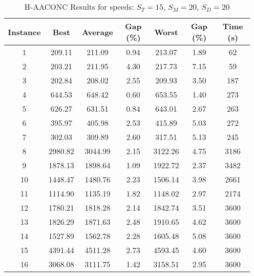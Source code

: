 \begin{table}[h]
	\centering
	\caption{H-AACONC Results for speeds: $S_T=15$, $S_M=20$, $S_D=20$}
	\begin{tabular}{@{}ccccccc@{}}
		\midrule
		\textbf{Instance} & \textbf{Best} & \textbf{Average} & \textbf{Gap (\%)} & \textbf{Worst} & \textbf{Gap (\%)} & \textbf{Time (s)} \\ \midrule
		1  & 209.11 & 211.09 & 0.94 & 213.07 & 1.89 & 62   \\ \midrule
		2  & 203.21 & 211.95 & 4.30 & 217.73 & 7.15 & 59   \\ \midrule
		3  & 202.84 & 208.02 & 2.55 & 209.93 & 3.50 & 187  \\ \midrule
		4  & 644.53 & 648.42 & 0.60 & 653.55 & 1.40 & 273  \\ \midrule
		5  & 626.27 & 631.51 & 0.84 & 643.01 & 2.67 & 263  \\ \midrule
		6  & 395.97 & 405.98 & 2.53 & 415.89 & 5.03 & 272  \\ \midrule
		7  & 302.03 & 309.89 & 2.60 & 317.51 & 5.13 & 245  \\ \midrule
		8  & 2980.82 & 3044.99 & 2.15 & 3122.26 & 4.75 & 3186  \\ \midrule
		9  & 1878.13 & 1898.64 & 1.09 & 1922.72 & 2.37 & 3482  \\ \midrule
		10 & 1448.47 & 1480.76 & 2.23 & 1506.14 & 3.98 & 2661  \\ \midrule
		11 & 1114.90 & 1135.19 & 1.82 & 1148.02 & 2.97 & 2174  \\ \midrule
		12 & 1780.21 & 1818.28 & 2.14 & 1842.74 & 3.51 & 3600  \\ \midrule
		13 & 1826.29 & 1871.63 & 2.48 & 1910.65 & 4.62 & 3600  \\ \midrule
		14 & 1527.89 & 1562.78 & 2.28 & 1605.48 & 5.08 & 3600  \\ \midrule
		15 & 4391.44 & 4511.28 & 2.73 & 4593.45 & 4.60 & 3600  \\ \midrule
		16 & 3068.08 & 3111.75 & 1.42 & 3158.51 & 2.95 & 3600  \\ \midrule
	\end{tabular}
	\label{table:ACO_15-20-20}
\end{table}
